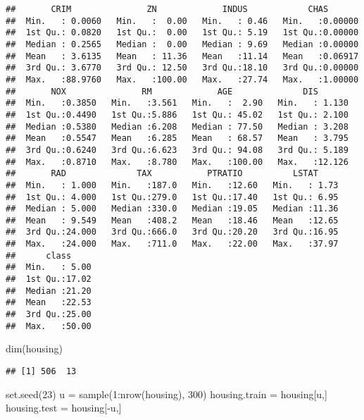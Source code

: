 \documentclass[
]{article}
\newenvironment{Shaded}{\begin{snugshade}}{\end{snugshade}}
\newcommand{\DecValTok}[1]{\textcolor[rgb]{0.00,0.00,0.81}{#1}}
\newcommand{\FunctionTok}[1]{\textcolor[rgb]{0.00,0.00,0.00}{#1}}
\newcommand{\NormalTok}[1]{#1}
\newcommand{\OtherTok}[1]{\textcolor[rgb]{0.56,0.35,0.01}{#1}}
\newcommand{\SpecialCharTok}[1]{\textcolor[rgb]{0.00,0.00,0.00}{#1}}
\begin{document}
\begin{verbatim}
##       CRIM               ZN             INDUS            CHAS        
##  Min.   : 0.0060   Min.   :  0.00   Min.   : 0.46   Min.   :0.00000  
##  1st Qu.: 0.0820   1st Qu.:  0.00   1st Qu.: 5.19   1st Qu.:0.00000  
##  Median : 0.2565   Median :  0.00   Median : 9.69   Median :0.00000  
##  Mean   : 3.6135   Mean   : 11.36   Mean   :11.14   Mean   :0.06917  
##  3rd Qu.: 3.6770   3rd Qu.: 12.50   3rd Qu.:18.10   3rd Qu.:0.00000  
##  Max.   :88.9760   Max.   :100.00   Max.   :27.74   Max.   :1.00000  
##       NOX               RM             AGE              DIS        
##  Min.   :0.3850   Min.   :3.561   Min.   :  2.90   Min.   : 1.130  
##  1st Qu.:0.4490   1st Qu.:5.886   1st Qu.: 45.02   1st Qu.: 2.100  
##  Median :0.5380   Median :6.208   Median : 77.50   Median : 3.208  
##  Mean   :0.5547   Mean   :6.285   Mean   : 68.57   Mean   : 3.795  
##  3rd Qu.:0.6240   3rd Qu.:6.623   3rd Qu.: 94.08   3rd Qu.: 5.189  
##  Max.   :0.8710   Max.   :8.780   Max.   :100.00   Max.   :12.126  
##       RAD              TAX           PTRATIO          LSTAT      
##  Min.   : 1.000   Min.   :187.0   Min.   :12.60   Min.   : 1.73  
##  1st Qu.: 4.000   1st Qu.:279.0   1st Qu.:17.40   1st Qu.: 6.95  
##  Median : 5.000   Median :330.0   Median :19.05   Median :11.36  
##  Mean   : 9.549   Mean   :408.2   Mean   :18.46   Mean   :12.65  
##  3rd Qu.:24.000   3rd Qu.:666.0   3rd Qu.:20.20   3rd Qu.:16.95  
##  Max.   :24.000   Max.   :711.0   Max.   :22.00   Max.   :37.97  
##      class      
##  Min.   : 5.00  
##  1st Qu.:17.02  
##  Median :21.20  
##  Mean   :22.53  
##  3rd Qu.:25.00  
##  Max.   :50.00
\end{verbatim}

\begin{Shaded}
\begin{Highlighting}[]
\FunctionTok{dim}\NormalTok{(housing)}
\end{Highlighting}
\end{Shaded}

\begin{verbatim}
## [1] 506  13
\end{verbatim}

\begin{Shaded}
\begin{Highlighting}[]
\FunctionTok{set.seed}\NormalTok{(}\DecValTok{23}\NormalTok{)}
\NormalTok{u }\OtherTok{=} \FunctionTok{sample}\NormalTok{(}\DecValTok{1}\SpecialCharTok{:}\FunctionTok{nrow}\NormalTok{(housing), }\DecValTok{300}\NormalTok{)}
\NormalTok{housing.train }\OtherTok{=}\NormalTok{ housing[u,]}
\NormalTok{housing.test }\OtherTok{=}\NormalTok{ housing[}\SpecialCharTok{{-}}\NormalTok{u,]}
\end{Highlighting}
\end{Shaded}
\end{document}
